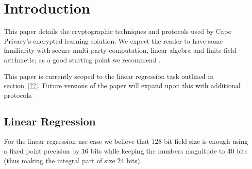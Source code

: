 
\section{Introduction}

This paper details the cryptographic techniques and protocols used by Cape Privacy's encrypted learning solution. 
We expect the reader to have some familiarity with secure multi-party computation, linear algebra and finite field arithmetic; as a good starting point we recommend \cite{evans2017pragmatic}.

This paper is currently scoped to the linear regression task outlined in section~\ref{??}. Future versions of the paper will expand upon this with additional protocols.


\subsection{Linear Regression}



For the linear regression use-case we believe that $128$ bit field size is
enough using a fixed point precision by $16$ bits while keeping the numbers
magnitude to $40$ bits (thus making the integral part of size $24$ bits).
